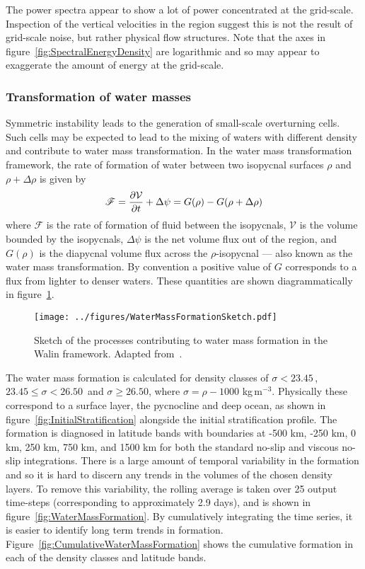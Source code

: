     The power spectra appear to show a lot of power concentrated at the grid-scale. Inspection of the vertical velocities in the region suggest this is not the result of grid-scale noise, but rather physical flow structures. Note that the axes in figure~\ref{fig:SpectralEnergyDensity} are logarithmic and so may appear to exaggerate the amount of energy at the grid-scale.

    \subsubsection{Transformation of water masses}
    \label{subsubsec:WaterMassTransformation}
    Symmetric instability leads to the generation of small-scale overturning cells. Such cells may be expected to lead to the mixing of waters with different density and contribute to water mass transformation. In the \citet{Walin1982} water mass transformation framework, the rate of formation of water between two isopycnal surfaces $\rho$ and $\rho + \Delta \rho$ is given by
    \begin{equation}
        \mathscr{F} = \pdv{\mathcal{V}}{t} + \Delta \psi = G(\rho) - G(\rho + \Delta \rho)
        \label{eq:WallinFormation}
    \end{equation}
    where $\mathscr{F}$ is the rate of formation of fluid between the isopycnals, $\mathcal{V}$ is the volume bounded by the isopycnals, $\Delta \psi$ is the net volume flux out of the region, and $G(\rho)$ is the diapycnal volume flux across the $\rho$-isopycnal --- also known as the water mass transformation. By convention a positive value of $G$ corresponds to a flux from lighter to denser waters. These quantities are shown diagrammatically in figure~\ref{fig:WaterMassFormationSketch}.

    \begin{figure} 
        \centering
        \texttt{[image: ../figures/WaterMassFormationSketch.pdf]}
        \caption{Sketch of the processes contributing to water mass formation in the Walin framework. Adapted from~\citet{Williams2011}.}
        \label{fig:WaterMassFormationSketch}
    \end{figure}

    The water mass formation is calculated for density classes of $\sigma < 23.45$\,,~$23.45 \leq \sigma < 26.50$~and $\sigma \geq 26.50$, where $\sigma = \rho - 1000$ kg\,m$^{-3}$. Physically these correspond to a surface layer, the pycnocline and deep ocean, as shown in figure~\ref{fig:InitialStratification} alongside the initial stratification profile. The formation is diagnosed in latitude bands with boundaries at -500 km, -250 km, 0 km, 250 km, 750 km, and 1500 km for both the standard no-slip  and viscous no-slip integrations. There is a large amount of temporal variability in the formation and so it is hard to discern any trends in the volumes of the chosen density layers. To remove this variability, the rolling average is taken over 25 output time-steps (corresponding to approximately 2.9 days), and is shown in figure~\ref{fig:WaterMassFormation}. By cumulatively integrating the time series, it is easier to identify long term trends in formation. Figure~\ref{fig:CumulativeWaterMassFormation} shows the cumulative formation in each of the density classes and latitude bands.

